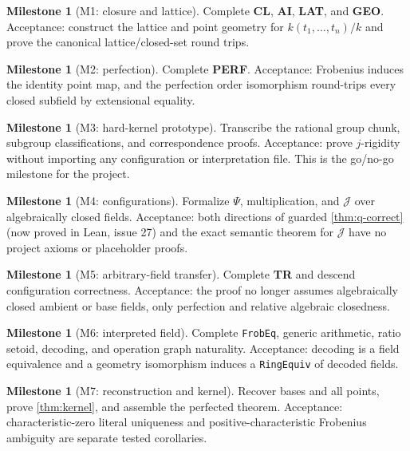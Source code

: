\documentclass[11pt,oneside]{article}
\theoremstyle{definition}
\newtheorem{milestone}[theorem]{Milestone}
\theoremstyle{remark}
\newcommand{\Jrel}{\mathcal{J}}
\newcommand{\lean}[1]{\nolinkurl{#1}}
\begin{document}
\begin{milestone}[M1: closure and lattice]
Complete \textbf{CL}, \textbf{AI}, \textbf{LAT}, and \textbf{GEO}.  Acceptance: construct
the lattice and point geometry for $k(t_1,\ldots,t_n)/k$ and prove the canonical
lattice/closed-set round trips.
\end{milestone}

\begin{milestone}[M2: perfection]
Complete \textbf{PERF}.  Acceptance: Frobenius induces the identity point map, and the
perfection order isomorphism round-trips every closed subfield by extensional equality.
\end{milestone}

\begin{milestone}[M3: hard-kernel prototype]
Transcribe the rational group chunk, subgroup classifications, and correspondence proofs.
Acceptance: prove $j$-rigidity without importing any
configuration or interpretation file.  This is the go/no-go milestone for the project.
\end{milestone}

\begin{milestone}[M4: configurations]
Formalize $\Psi$, multiplication, and $\Jrel$ over algebraically closed fields.
Acceptance: both directions of guarded \cref{thm:q-correct} (now proved in Lean,
issue 27) and the exact semantic theorem for
$\Jrel$ have no project axioms or placeholder proofs.
\end{milestone}

\begin{milestone}[M5: arbitrary-field transfer]
Complete \textbf{TR} and descend configuration correctness.  Acceptance: the proof no
longer assumes algebraically closed ambient or base fields, only perfection and relative
algebraic closedness.
\end{milestone}

\begin{milestone}[M6: interpreted field]
Complete \lean{FrobEq}, generic arithmetic, ratio setoid, decoding, and operation graph
naturality.  Acceptance: decoding is a field equivalence and a geometry isomorphism
induces a \lean{RingEquiv} of decoded fields.
\end{milestone}

\begin{milestone}[M7: reconstruction and kernel]
Recover bases and all points, prove \cref{thm:kernel}, and assemble the perfected theorem.
Acceptance: characteristic-zero literal uniqueness and positive-characteristic Frobenius
ambiguity are separate tested corollaries.
\end{milestone}
\end{document}
